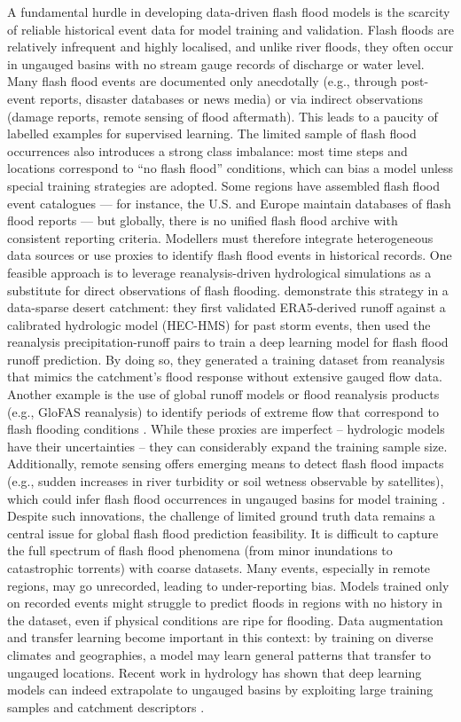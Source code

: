 A fundamental hurdle in developing data-driven flash flood models is the scarcity of reliable historical event data for model training and validation. Flash floods are relatively infrequent and highly localised, and unlike river floods, they often occur in ungauged basins with no stream gauge records of discharge or water level. Many flash flood events are documented only anecdotally (e.g., through post-event reports, disaster databases or news media) or via indirect observations (damage reports, remote sensing of flood aftermath). This leads to a paucity of labelled examples for supervised learning. The limited sample of flash flood occurrences also introduces a strong class imbalance: most time steps and locations correspond to “no flash flood” conditions, which can bias a model unless special training strategies are adopted. Some regions have assembled flash flood event catalogues — for instance, the U.S. and Europe maintain databases of flash flood reports — but globally, there is no unified flash flood archive with consistent reporting criteria. Modellers must therefore integrate heterogeneous data sources or use proxies to identify flash flood events in historical records. One feasible approach is to leverage reanalysis-driven hydrological simulations as a substitute for direct observations of flash flooding. \citet{Alkaabi2025} demonstrate this strategy in a data-sparse desert catchment: they first validated ERA5-derived runoff against a calibrated hydrologic model (HEC-HMS) for past storm events, then used the reanalysis precipitation-runoff pairs to train a deep learning model for flash flood runoff prediction. By doing so, they generated a training dataset from reanalysis that mimics the catchment’s flood response without extensive gauged flow data. Another example is the use of global runoff models or flood reanalysis products (e.g., GloFAS reanalysis) to identify periods of extreme flow that correspond to flash flooding conditions \citep{Wu2022}. While these proxies are imperfect – hydrologic models have their uncertainties – they can considerably expand the training sample size. Additionally, remote sensing offers emerging means to detect flash flood impacts (e.g., sudden increases in river turbidity or soil wetness observable by satellites), which could infer flash flood occurrences in ungauged basins for model training \citep{Smith2021}. Despite such innovations, the challenge of limited ground truth data remains a central issue for global flash flood prediction feasibility. It is difficult to capture the full spectrum of flash flood phenomena (from minor inundations to catastrophic torrents) with coarse datasets. Many events, especially in remote regions, may go unrecorded, leading to under-reporting bias. Models trained only on recorded events might struggle to predict floods in regions with no history in the dataset, even if physical conditions are ripe for flooding. Data augmentation and transfer learning become important in this context: by training on diverse climates and geographies, a model may learn general patterns that transfer to ungauged locations. Recent work in hydrology has shown that deep learning models can indeed extrapolate to ungauged basins by exploiting large training samples and catchment descriptors \citep{Kratzert2019, Gilon2024}. 